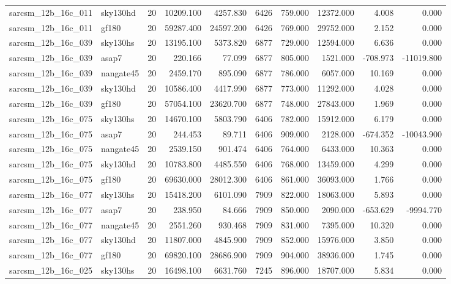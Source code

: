 \begin{longtable}{llrrrrrrrr}
sarcsm\_12b\_16c\_011 & sky130hd & 20 & 10209.100 & 4257.830 & 6426 & 759.000 & 12372.000 & 4.008 & 0.000 \\
sarcsm\_12b\_16c\_011 & gf180 & 20 & 59287.400 & 24597.200 & 6426 & 769.000 & 29752.000 & 2.152 & 0.000 \\
sarcsm\_12b\_16c\_039 & sky130hs & 20 & 13195.100 & 5373.820 & 6877 & 729.000 & 12594.000 & 6.636 & 0.000 \\
sarcsm\_12b\_16c\_039 & asap7 & 20 & 220.166 & 77.099 & 6877 & 805.000 & 1521.000 & -708.973 & -11019.800 \\
sarcsm\_12b\_16c\_039 & nangate45 & 20 & 2459.170 & 895.090 & 6877 & 786.000 & 6057.000 & 10.169 & 0.000 \\
sarcsm\_12b\_16c\_039 & sky130hd & 20 & 10586.400 & 4417.990 & 6877 & 773.000 & 11292.000 & 4.028 & 0.000 \\
sarcsm\_12b\_16c\_039 & gf180 & 20 & 57054.100 & 23620.700 & 6877 & 748.000 & 27843.000 & 1.969 & 0.000 \\
sarcsm\_12b\_16c\_075 & sky130hs & 20 & 14670.100 & 5803.790 & 6406 & 782.000 & 15912.000 & 6.179 & 0.000 \\
sarcsm\_12b\_16c\_075 & asap7 & 20 & 244.453 & 89.711 & 6406 & 909.000 & 2128.000 & -674.352 & -10043.900 \\
sarcsm\_12b\_16c\_075 & nangate45 & 20 & 2539.150 & 901.474 & 6406 & 764.000 & 6433.000 & 10.363 & 0.000 \\
sarcsm\_12b\_16c\_075 & sky130hd & 20 & 10783.800 & 4485.550 & 6406 & 768.000 & 13459.000 & 4.299 & 0.000 \\
sarcsm\_12b\_16c\_075 & gf180 & 20 & 69630.000 & 28012.300 & 6406 & 861.000 & 36093.000 & 1.766 & 0.000 \\
sarcsm\_12b\_16c\_077 & sky130hs & 20 & 15418.200 & 6101.090 & 7909 & 822.000 & 18063.000 & 5.893 & 0.000 \\
sarcsm\_12b\_16c\_077 & asap7 & 20 & 238.950 & 84.666 & 7909 & 850.000 & 2090.000 & -653.629 & -9994.770 \\
sarcsm\_12b\_16c\_077 & nangate45 & 20 & 2551.260 & 930.468 & 7909 & 831.000 & 7395.000 & 10.320 & 0.000 \\
sarcsm\_12b\_16c\_077 & sky130hd & 20 & 11807.000 & 4845.900 & 7909 & 852.000 & 15976.000 & 3.850 & 0.000 \\
sarcsm\_12b\_16c\_077 & gf180 & 20 & 69820.100 & 28686.900 & 7909 & 904.000 & 38936.000 & 1.745 & 0.000 \\
sarcsm\_12b\_16c\_025 & sky130hs & 20 & 16498.100 & 6631.760 & 7245 & 896.000 & 18707.000 & 5.834 & 0.000 \\

\end{longtable}

